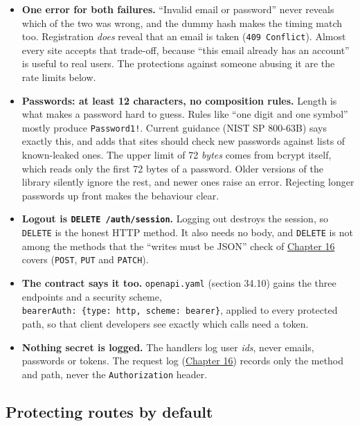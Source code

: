 \begin{itemize}
\tightlist
\item
  \textbf{One error for both failures.} ``Invalid email or password'' never reveals which of the two was wrong, and the dummy hash makes the timing match too. Registration \emph{does} reveal that an email is taken (\texttt{409\ Conflict}). Almost every site accepts that trade-off, because ``this email already has an account'' is useful to real users. The protections against someone abusing it are the rate limits below.
\item
  \textbf{Passwords: at least 12 characters, no composition rules.} Length is what makes a password hard to guess. Rules like ``one digit and one symbol'' mostly produce \texttt{Password1!}. Current guidance (NIST SP 800-63B) says exactly this, and adds that sites should check new passwords against lists of known-leaked ones. The upper limit of 72 \emph{bytes} comes from bcrypt itself, which reads only the first 72 bytes of a password. Older versions of the library silently ignore the rest, and newer ones raise an error. Rejecting longer passwords up front makes the behaviour clear.
\item
  \textbf{Logout is \texttt{DELETE\ /}\allowbreak{}\texttt{auth/}\allowbreak{}\texttt{session}.} Logging out destroys the session, so \texttt{DELETE} is the honest HTTP method. It also needs no body, and \texttt{DELETE} is not among the methods that the ``writes must be JSON'' check of \hyperref[ch:16-logging-error-handling]{Chapter 16} covers (\texttt{POST}, \texttt{PUT} and \texttt{PATCH}).
\item
  \textbf{The contract says it too.} \texttt{openapi.yaml} (section 34.10) gains the three endpoints and a security scheme, \texttt{bearerAuth:}\allowbreak{}\texttt{\ \{type:}\allowbreak{}\texttt{\ http,}\allowbreak{}\texttt{\ scheme:}\allowbreak{}\texttt{\ bearer\}}, applied to every protected path, so that client developers see exactly which calls need a token.
\item
  \textbf{Nothing secret is logged.} The handlers log user \emph{ids}, never emails, passwords or tokens. The request log (\hyperref[ch:16-logging-error-handling]{Chapter 16}) records only the method and path, never the \texttt{Authorization} header.
\end{itemize}

\subsection*{Protecting routes by default}\label{38-security:protecting-routes-by-default}

